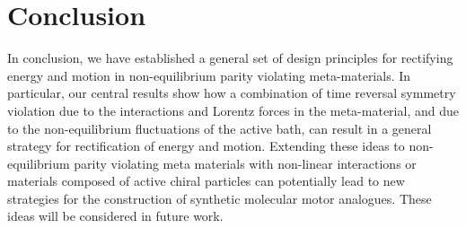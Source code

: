 \documentclass[
 preprint,
 preprintnumbers,
 amsmath,amssymb,
 aps,
 pre,
 longbibliography,
 superscriptaddress,
 10pt, twocolumn
]{revtex4-1}
\begin{document}




\section{Conclusion} \label{sec:conclusion}

In conclusion, we have established a general set of design principles for rectifying energy and motion in non-equilibrium parity violating meta-materials. In particular, our central results show how a combination of time reversal symmetry violation due to the interactions and Lorentz forces in the meta-material, and due to the non-equilibrium fluctuations of the active bath, can result in a general strategy for rectification of energy and motion. Extending these ideas to non-equilibrium parity violating meta materials with non-linear interactions or materials composed of active chiral particles can potentially lead to new strategies for the construction of synthetic molecular motor analogues. These ideas will be considered in future work. 
\end{document}

